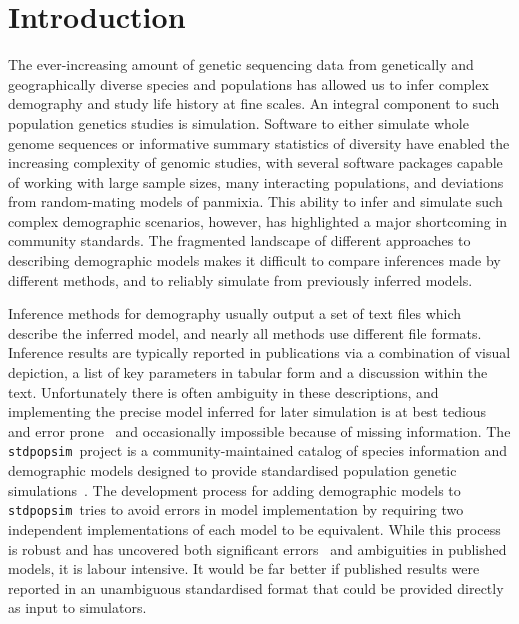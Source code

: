 \documentclass[11pt]{article}
\newcommand{\stdpopsim}[0]{\texttt{stdpopsim}}
\begin{document}
\section*{Introduction}

The ever-increasing amount of genetic sequencing data from genetically and
geographically diverse species and populations has allowed us to infer complex
demography and study life history at fine scales. An integral component to such
population genetics studies is simulation. Software to either simulate whole
genome sequences
\citep{thornton2014cpp,thornton2019-nu,staab2015scrm,baumdicker2021-iu,kelleher2016efficient,haller2019slim}
or informative summary statistics of diversity
\citep{gutenkunst2009inferring,kamm2017efficient,jouganous2017inferring} have
enabled the increasing complexity of genomic studies, with several software
packages capable of working with large sample sizes, many interacting populations, and
deviations from random-mating models of panmixia.
This ability to infer and simulate such complex demographic scenarios, however,
has highlighted a major shortcoming in community standards. The fragmented
landscape of different approaches to describing demographic models makes
it difficult to compare inferences made by different methods,
and to reliably simulate from previously inferred models.

Inference methods for demography usually output a set of
text files which describe the inferred model,
and nearly all methods use different file formats.
Inference results are typically reported in publications
via a combination of visual depiction,
a list of key parameters in tabular form and a discussion within the text.
Unfortunately there is often ambiguity in these descriptions, and
implementing the precise model inferred for later simulation
is at best tedious and error prone~\citep{ragsdale2020lessons}
and occasionally impossible because of missing information.
The \stdpopsim\ project is a community-maintained catalog of species
information and demographic models designed to provide standardised
population genetic simulations~\citep{adrion2020community}.
The development process for adding demographic models to
\stdpopsim\ tries to avoid errors in model implementation by requiring two
independent implementations of each model
to be equivalent. While this process is
robust and has uncovered both significant
errors~\citep{ragsdale2020lessons} and ambiguities in
published models, it is labour intensive.
It would be far better if published results
were reported in an unambiguous standardised format that could be provided
directly as input to simulators.
\end{document}
